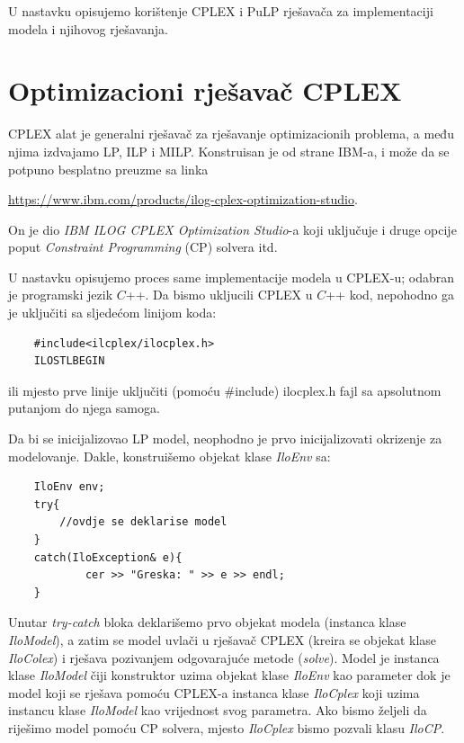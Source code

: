 \documentclass[a4paper, utf8, 11pt, colorlinks]{book}
\begin{document}
 U nastavku opisujemo korištenje CPLEX i PuLP rješavača za implementaciji modela i njihovog rješavanja. 
 
 \section{Optimizacioni rješavač CPLEX}
 CPLEX alat je generalni rješavač za rješavanje optimizacionih problema, a među njima izdvajamo LP, ILP i MILP. Konstruisan je od strane IBM-a, i može da se potpuno besplatno preuzme sa linka 
 
 \url{https://www.ibm.com/products/ilog-cplex-optimization-studio}. 
 
 On je dio \emph{IBM ILOG CPLEX Optimization Studio}-a koji uključuje i druge opcije poput \emph{Constraint Programming} (CP) solvera itd.
 
 U nastavku opisujemo proces same implementacije modela u CPLEX-u; odabran je programski jezik $C$++.
 Da bismo ukljucili CPLEX u $C$++ kod, nepohodno ga je uključiti sa sljedećom linijom koda:
 \begin{verbatim}
 	#include<ilcplex/ilocplex.h>
 	ILOSTLBEGIN
 \end{verbatim}
ili mjesto prve linije uključiti (pomoću \#include) ilocplex.h fajl sa apsolutnom putanjom do njega samoga. 

 Da bi se inicijalizovao LP model, neophodno je prvo inicijalizovati okrizenje za modelovanje. Dakle, konstruišemo objekat klase \emph{IloEnv} sa: 
 \begin{verbatim}
 	IloEnv env;
 	try{
 		//ovdje se deklarise model
 	}
 	catch(IloException& e){
 		    cer >> "Greska: " >> e >> endl;
 	}
 \end{verbatim}
 
 \noindent Unutar \emph{try-catch} bloka deklarišemo prvo objekat modela (instanca klase \emph{IloModel}), a zatim se model uvlači u rješavač CPLEX (kreira se objekat klase \emph{IloColex}) i rješava pozivanjem odgovarajuće metode (\emph{solve}).
 Model je instanca klase \emph{IloModel} čiji konstruktor uzima objekat klase \emph{IloEnv} kao parameter dok je model koji se rješava pomoću CPLEX-a instanca klase \emph{IloCplex} koji uzima instancu klase \emph{IloModel} kao vrijednost svog parametra.  Ako bismo željeli da riješimo model pomoću CP solvera, mjesto \emph{IloCplex} bismo pozvali klasu \emph{IloCP}. 
 
\end{document}
